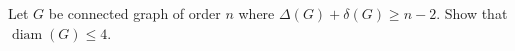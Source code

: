 \question Let \(G\) be connected graph of order \(n\) where
\(\Delta(G)+\delta(G) \geq n-2\). Show that \(\operatorname{diam}
(G) \leq 4\).

\begin{solution}
  
\end{solution}
